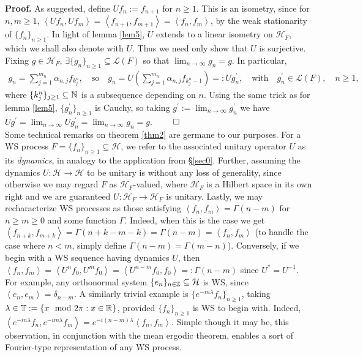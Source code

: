 \documentclass[11pt]{report}
\newcommand{\mc}[1]{\mathcal{#1}}
\newcommand{\ip}[2]{\left\langle#1,#2\right\rangle }
\newcommand{\1}[1]{\mathbbm{1}_{\{#1\}}}
\theoremstyle{definition}
\begin{document}
    \noindent\textbf{Proof.} As suggested, define $Uf_n:=f_{n+1}$ for $n\geq 1$.
    This is an isometry, since for $n,m\geq 1$,
    $\ip{Uf_n}{Uf_m}=\ip{f_{n+1}}{f_{m+1}}=\ip{f_n}{f_m}$, by the weak
    stationarity of $\{f_n\}_{n\geq 1}$. In light of lemma \ref{lem5}, $U$
    extends to a linear isometry on $\mc{H}_F$, which we shall also denote with
    $U$. Thus we need only show that $U$ is surjective. Fixing $g\in\mc{H}_F$,
    $\exists \{g_n\}_{n\geq 1}\subseteq\mc{L}(F)$ so that
    $\lim_{n\rightarrow\infty}g_n=g$. In particular,
    \begin{align*}
        g_n=\sum_{j=1}^{m_n}\alpha_{n,j}f_{k^n_j},\quad\text{so}\quad g_n=U\left(\sum_{j=1}^{m_n}\alpha_{n,j}f_{k^n_j-1}\right)=:Ug^\prime_n,\quad\text{with}\quad g^\prime_n\in\mc{L}(F),\quad n\geq 1,
    \end{align*}
    where $\{k^n_j\}_{j\geq 1}\subseteq\mathbb{N}$ is a subsequence depending on
    $n$. Using the same trick as for lemma \ref{lem5}, $\{g_n^\prime\}_{n\geq
    1}$ is Cauchy, so taking $g^\prime:=\lim_{n\rightarrow\infty}g^\prime_n$ we
    have
    $Ug^\prime=\lim_{n\rightarrow\infty}Ug^\prime_n=\lim_{n\rightarrow\infty}g_n=g$.
    \hfill{$\qed$}\\[5pt]
    \indent Some technical remarks on theorem \ref{thm2} are germane to our
    purposes. For a WS process $F=\{f_n\}_{n\geq 1}\subseteq\mc{H}$, we refer to
    the associated unitary operator $U$ as its \textit{dynamics}, in analogy to
    the application from \S \ref{sec0}. Further, assuming the dynamics
    $U:\mc{H}\rightarrow\mc{H}$ to be unitary is without any loss of generality,
    since otherwise we may regard $F$ as $\mc{H}_F$-valued, where $\mc{H}_F$ is
    a Hilbert space in its own right and we are guaranteed
    $U:\mc{H}_F\rightarrow\mc{H}_F$ is unitary. Lastly, we may recharacterize WS
    processes as those satisfying $\ip{f_n}{f_m}=\Gamma(n-m)$ for $n\geq m\geq
    0$ and some function $\Gamma$. Indeed, when this is the case we get
    $\ip{f_{n+k}}{f_{m+k}}=\Gamma(n+k-m-k)=\Gamma(n-m)=\ip{f_n}{f_m}$
    (to handle the case where $n<m$, simply define
    $\Gamma(n-m)=\overline{\Gamma(m-n)}$). Conversely, if we begin with a WS
    sequence having dynamics $U$, then
    $\ip{f_n}{f_m}=\ip{U^nf_0}{U^mf_0}=\ip{U^{n-m}f_0}{f_0}=:\Gamma(n-m)$ since
    $U^\ast=U^{-1}$. For example, any orthonormal system
    $\{e_n\}_{n\in\mbb{Z}}\subseteq\mc{H}$ is WS, since
    $\ip{e_n}{e_m}=\delta_{n-m}$. A similarly trivial example is
    $\{e^{-in\lambda}f_n\}_{n\geq 1}$, taking
    $\lambda\in\mathbb{T}:=\{x\mod2\pi:x\in\mathbb{R}\}$, provided $\{f_n\}_{n\geq 1}$
    is WS to begin with. Indeed,
    $\ip{e^{-in\lambda}f_n}{e^{-im\lambda}f_m}=e^{-i(n-m)\lambda}\ip{f_n}{f_m}$.
    Simple though it may be, this observation, in conjunction with the mean
    ergodic theorem, enables a sort of Fourier-type representation of any WS
    process.
\end{document}
